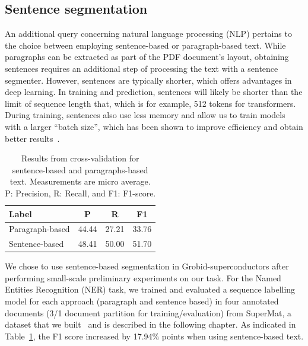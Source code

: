 \subsection{Sentence segmentation}
An additional query concerning natural language processing (NLP) pertains to the choice between employing sentence-based or paragraph-based text.
While paragraphs can be extracted as part of the PDF document's layout, obtaining sentences requires an additional step of processing the text with a sentence segmenter. However, sentences are typically shorter, which offers advantages in deep learning.
In training and prediction, sentences will likely be shorter than the limit of sequence length that, which is for example, 512 tokens for transformers.
During training, sentences also use less memory and allow us to train models with a larger ``batch size'', which has been shown to improve efficiency and obtain better results~\cite{liu2019roberta}. 

\begin{table}[ht]
    \centering
    \caption{Results from cross-validation for sentence-based and paragraphs-based text. Measurements are micro average. P: Precision, R: Recall, and F1: F1-score.}
    
    \begin{tabular}{lccc}
        \toprule
        \textbf{Label}   & \textbf{P}   & \textbf{R}    & \textbf{F1} \\
        \midrule
        Paragraph-based  & 44.44        & 27.21         & 33.76       \\
        Sentence-based   & 48.41        & 50.00         & 51.70       \\
        \bottomrule
    \end{tabular}

    \label{tab:comparison-evaluation-sentences-paragraphs}
\end{table}

We chose to use sentence-based segmentation in Grobid-superconductors after performing small-scale preliminary experiments on our task. 
For the Named Entities Recognition (NER) task, we trained and evaluated a sequence labelling model for each approach (paragraph and sentence based) in four annotated documents (3/1 document partition for training/evaluation) from SuperMat, a dataset that we built~\cite{foppiano2021supermat} and is described in the following chapter.
As indicated in Table~\ref{tab:comparison-evaluation-sentences-paragraphs}, the F1 score increased by 17.94\% points when using sentence-based text.


